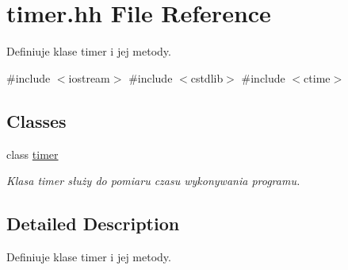 \hypertarget{timer_8hh}{\section{timer.\-hh \-File \-Reference}
\label{timer_8hh}
}


\-Definiuje klase timer i jej metody.  


{\ttfamily \#include $<$iostream$>$}\*
{\ttfamily \#include $<$cstdlib$>$}\*
{\ttfamily \#include $<$ctime$>$}\*
\subsection*{\-Classes}
\begin{DoxyCompactItemize}
\item 
class \hyperlink{classtimer}{timer}
\begin{DoxyCompactList}\small\item\em \-Klasa timer służy do pomiaru czasu wykonywania programu. \end{DoxyCompactList}\end{DoxyCompactItemize}


\subsection{\-Detailed \-Description}
\-Definiuje klase timer i jej metody. 